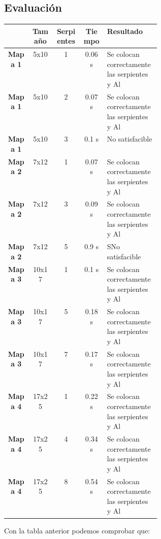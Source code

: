 \documentclass[11pt,spanish]{article}
\begin{document}
		\subsection{Evaluación}
			\begin{tabular}{ |c||c|c|c|p{0.35\linewidth}| }
				\hline
				&\textbf{Tamaño}&\textbf{Serpientes}&\textbf{Tiempo}&\textbf{Resultado}\\
				\hline
				\hline
				\textbf{Mapa 1}&5x10&1&0.06 s&Se colocan correctamente las serpientes y Al\\
				\hline
				\textbf{Mapa 1}&5x10&2&0.07 s&Se colocan correctamente las serpientes y Al\\
				\hline
				\textbf{Mapa 1}&5x10&3&0.1 s&No satisfacible\\
				\hline
				\textbf{Mapa 2}&7x12&1&0.07 s&Se colocan correctamente las serpientes y Al\\
				\hline
				\textbf{Mapa 2}&7x12&3&0.09 s&Se colocan correctamente las serpientes y Al\\
				\hline
				\textbf{Mapa 2}&7x12&5&0.9 s&SNo satisfacible\\
				\hline
				\textbf{Mapa 3}&10x17&1&0.1 s&Se colocan correctamente las serpientes y Al\\
				\hline
				\textbf{Mapa 3}&10x17&5&0.18 s&Se colocan correctamente las serpientes y Al\\
				\hline
				\textbf{Mapa 3}&10x17&7&0.17 s&Se colocan correctamente las serpientes y Al\\
				\hline
				\textbf{Mapa 4}&17x25&1&0.22 s&Se colocan correctamente las serpientes y Al\\
				\hline
				\textbf{Mapa 4}&17x25&4&0.34 s&Se colocan correctamente las serpientes y Al\\
				\hline
				\textbf{Mapa 4}&17x25&8&0.54 s&Se colocan correctamente las serpientes y Al\\
				\hline
			\end{tabular}
			Con la tabla anterior podemos comprobar que:
\end{document}
